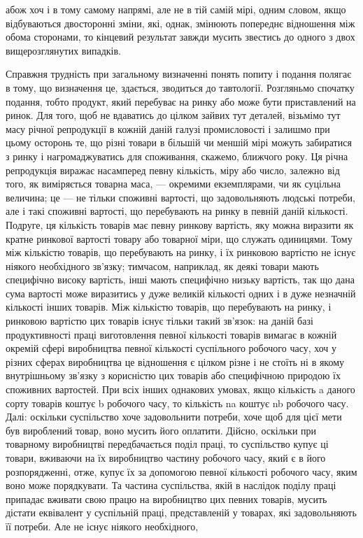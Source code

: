 \parcont{}  %
абож хоч і в тому самому напрямі, але не в тій самій мірі,
одним словом, якщо відбуваються двосторонні зміни, які, однак,
змінюють попереднє відношення між обома сторонами, то кінцевий
результат завжди мусить звестись до одного з двох
вищерозглянутих випадків.

Справжня трудність при загальному визначенні понять попиту
і подання полягає в тому, що визначення це, здається, зводиться
до тавтології. Розгляньмо спочатку подання, тобто продукт,
який перебуває на ринку або може бути приставлений на
ринок. Для того, щоб не вдаватись до цілком зайвих тут
деталей, візьмімо тут масу річної репродукції в кожній даній
галузі промисловості і залишмо при цьому осторонь те, що різні
товари в більшій чи меншій мірі можуть забиратися з ринку
і нагромаджуватись для споживання, скажемо, ближчого року.
Ця річна репродукція виражає насамперед певну кількість, міру
або число, залежно від того, як виміряється товарна маса, —
окремими екземплярами, чи як суцільна величина; це — не тільки
споживні вартості, що задовольняють людські потреби, але і такі
споживні вартості, що перебувають на ринку в певній даній
кількості. Подруге, ця кількість товарів має певну ринкову
вартість, яку можна виразити як кратне ринкової вартості товару
або товарної міри, що служать одиницями. Тому між
кількістю товарів, що перебувають на ринку, і їх ринковою
вартістю не існує ніякого необхідного зв’язку; тимчасом, наприклад,
як деякі товари мають специфічно високу вартість,
інші мають специфічно низьку вартість, так що дана сума вартості
може виразитись у дуже великій кількості одних і в дуже
незначній кількості інших товарів. Між кількістю товарів, що
перебувають на ринку, і ринковою вартістю цих товарів існує
тільки такий зв’язок: на даній базі продуктивності праці виготовлення
певної кількості товарів вимагає в кожній окремій
сфері виробництва певної кількості суспільного робочого часу,
хоч у різних сферах виробництва це відношення є цілком різне
і не стоїть ні в якому внутрішньому зв’язку з корисністю цих
товарів або специфічною природою їх споживних вартостей.
При всіх інших однакових умовах, якщо кількість a даного
сорту товарів коштує b робочого часу, то кількість na коштує
nb робочого часу. Далі: оскільки суспільство хоче задовольнити
потреби, хоче щоб для цієї мети був вироблений товар, воно мусить
його оплатити. Дійсно, оскільки при товарному виробництві
передбачається поділ праці, то суспільство купує ці товари,
вживаючи на їх виробництво частину робочого часу, який
є в його розпорядженні, отже, купує їх за допомогою певної
кількості робочого часу, яким воно може порядкувати. Та частина
суспільства, якій в наслідок поділу праці припадає вживати
свою працю на виробництво цих певних товарів, мусить
дістати еквівалент у суспільній праці, представленій у товарах,
які задовольняють її потреби. Але не існує ніякого необхідного,
\parbreak{}  %
